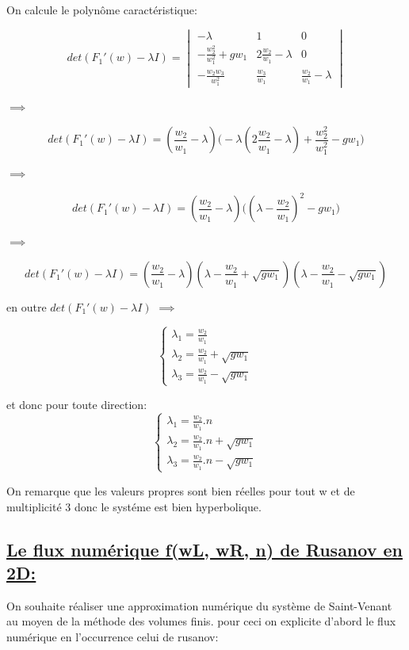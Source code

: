 On calcule le polyn\^ome caract\'eristique:

$$det(F_1'(w) - \lambda I) = \begin{vmatrix}
-\lambda & 1& 0\\
-\frac{w_2^2}{w_1^2} + g w_1 & 2 \frac{w_2}{w_1} - \lambda & 0\\
-\frac{w_2 w_3} {w_1^2} & \frac{w_3} {w_1} & \frac{w_2} {w_1} - \lambda
\end{vmatrix} $$

$\implies$

$$det(F_1'(w) - \lambda I) = (\frac{w_2} {w_1} - \lambda) \big(-\lambda (2 \frac{w_2}{w_1} - \lambda) + \frac{w_2^2}{w_1^2} - g w_1 \big)$$

$\implies$

$$det(F_1'(w) - \lambda I) = (\frac{w_2}{w_1} - \lambda) \big((\lambda - \frac{w_2}{w_1})^2  - g w_1 \big)$$

$\implies$

$$det(F_1'(w) - \lambda I) = (\frac{w_2}{w_1} - \lambda) (\lambda - \frac{w_2}{w_1} + \sqrt{g w_1})(\lambda - \frac{w_2}{w_1} - \sqrt{g w_1})$$

en outre $det(F_1'(w) - \lambda I)$ $\implies$

$$\left \lbrace \begin{array}{rl}
\lambda_1 = \frac{w_2}{w_1} \\
\lambda_2 =  \frac{w_2}{w_1} + \sqrt{g w_1}\\
\lambda_3 =  \frac{w_2}{w_1} - \sqrt{g w_1}
\end{array}\right.$$

et donc pour toute direction:
$$\left \lbrace \begin{array}{rl}
\lambda_1 = \frac{w_2}{w_1}.n \\
\lambda_2 =  \frac{w_2}{w_1}.n + \sqrt{g w_1}\\
\lambda_3 =  \frac{w_2}{w_1}.n - \sqrt{g w_1}
\end{array}\right.$$

On remarque que les valeurs propres sont bien r\'eelles pour tout w et de multiplicit\'e 3 donc le syst\'eme est bien hyperbolique.

\subsection[Le flux num\'erique f(wL, wR, n) de Rusanov en 2D]{\uline{Le flux num\'erique f(wL, wR, n) de Rusanov en 2D:}}

On souhaite réaliser une approximation numérique du système de Saint-Venant au moyen de la méthode des volumes finis. pour ceci on explicite d'abord le flux numérique en l'occurrence celui de rusanov:

